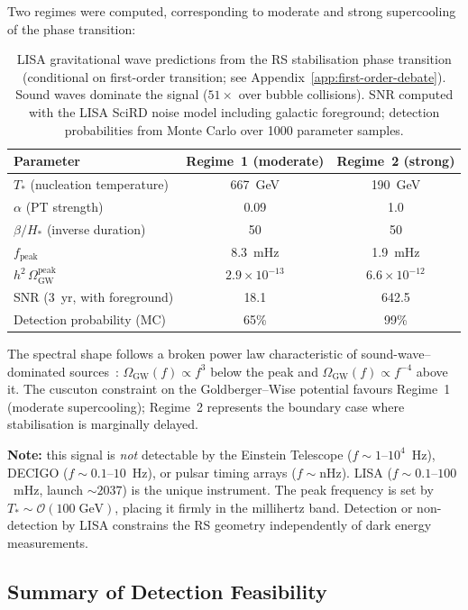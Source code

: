 Two regimes were computed, corresponding to moderate and strong supercooling of the phase transition:

\begin{table}[ht]
\centering
\caption{LISA gravitational wave predictions from the RS stabilisation phase transition (conditional on first-order transition; see Appendix~\ref{app:first-order-debate}). Sound waves dominate the signal ($51\times$ over bubble collisions). SNR computed with the LISA SciRD noise model including galactic foreground; detection probabilities from Monte Carlo over 1000 parameter samples.}
\label{tab:5-LISA}
\small
\begin{tabular}{lcc}
\toprule
Parameter & Regime~1 (moderate) & Regime~2 (strong) \\
\midrule
$T_*$ (nucleation temperature) & 667~GeV & 190~GeV \\
$\alpha$ (PT strength) & 0.09 & 1.0 \\
$\beta/H_*$ (inverse duration) & 50 & 50 \\
$f_\mathrm{peak}$ & 8.3~mHz & 1.9~mHz \\
$h^2\,\Omega_\mathrm{GW}^\mathrm{peak}$ & $2.9 \times 10^{-13}$ & $6.6 \times 10^{-12}$ \\
SNR (3~yr, with foreground) & 18.1 & 642.5 \\
Detection probability (MC) & 65\% & 99\% \\
\bottomrule
\end{tabular}
\end{table}

The spectral shape follows a broken power law characteristic of sound-wave--dominated sources~\cite{ch5:Hindmarsh2015}: $\Omega_\mathrm{GW}(f) \propto f^3$ below the peak and $\Omega_\mathrm{GW}(f) \propto f^{-4}$ above it. The cuscuton constraint on the Goldberger--Wise potential favours Regime~1 (moderate supercooling); Regime~2 represents the boundary case where stabilisation is marginally delayed.

\textbf{Note:} this signal is \emph{not} detectable by the Einstein Telescope ($f \sim 1$--$10^4$~Hz), DECIGO ($f \sim 0.1$--$10$~Hz), or pulsar timing arrays ($f \sim \mathrm{nHz}$). LISA ($f \sim 0.1$--$100$~mHz, launch ${\sim}2037$) is the unique instrument. The peak frequency is set by $T_* \sim \mathcal{O}(100\;\mathrm{GeV})$, placing it firmly in the millihertz band. Detection or non-detection by LISA constrains the RS geometry independently of dark energy measurements.

\subsection{Summary of Detection Feasibility}
\label{sec:5-detection-summary}

